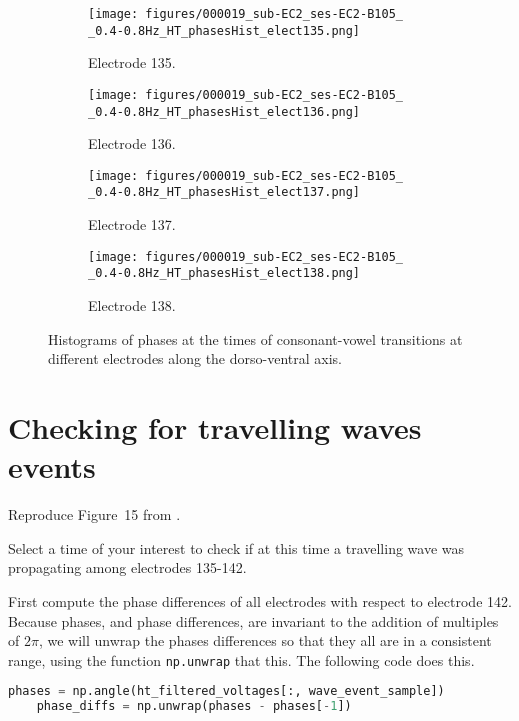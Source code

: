 \documentclass[12pt]{article}
\begin{document}
\begin{figure}
	\centering
	\begin{subfigure}{0.4\textwidth}
        \texttt{[image: figures/000019\_sub-EC2\_ses-EC2-B105\_\\[135,136,137,138,139,140,141,142\\]\_0.4-0.8Hz\_HT\_phasesHist\_elect135.png]}
    	\caption{Electrode 135.}
	\end{subfigure}
	\hfill
	\begin{subfigure}{0.4\textwidth}
        \texttt{[image: figures/000019\_sub-EC2\_ses-EC2-B105\_\\[135,136,137,138,139,140,141,142\\]\_0.4-0.8Hz\_HT\_phasesHist\_elect136.png]}
    	\caption{Electrode 136.}
	\end{subfigure}
	\hfill
	\begin{subfigure}{0.4\textwidth}
        \texttt{[image: figures/000019\_sub-EC2\_ses-EC2-B105\_\\[135,136,137,138,139,140,141,142\\]\_0.4-0.8Hz\_HT\_phasesHist\_elect137.png]}
    	\caption{Electrode 137.}
	\end{subfigure}
	\hfill
	\begin{subfigure}{0.4\textwidth}
        \texttt{[image: figures/000019\_sub-EC2\_ses-EC2-B105\_\\[135,136,137,138,139,140,141,142\\]\_0.4-0.8Hz\_HT\_phasesHist\_elect138.png]}
    	\caption{Electrode 138.}
	\end{subfigure}
	\caption{Histograms of phases at the times of consonant-vowel transitions at different electrodes along the dorso-ventral axis.}
    \label{fig:phasesHist}
\end{figure}

\section{Checking for travelling waves events}

Reproduce Figure~15 from \citet{rapelaInPrepSyncTWsII}.

Select a time of your interest to check if at this time a travelling wave was propagating among electrodes 135-142.

First compute the phase differences of all electrodes with respect to electrode 142. Because phases, and phase differences, are invariant to the addition of multiples of $2\pi$, we will unwrap the phases differences so that they all are in a consistent range, using the function \texttt{np.unwrap} that this. The following code does this.

\begin{lstlisting}[language=python]
    phases = np.angle(ht_filtered_voltages[:, wave_event_sample])
    phase_diffs = np.unwrap(phases - phases[-1])
\end{lstlisting}
\end{document}
